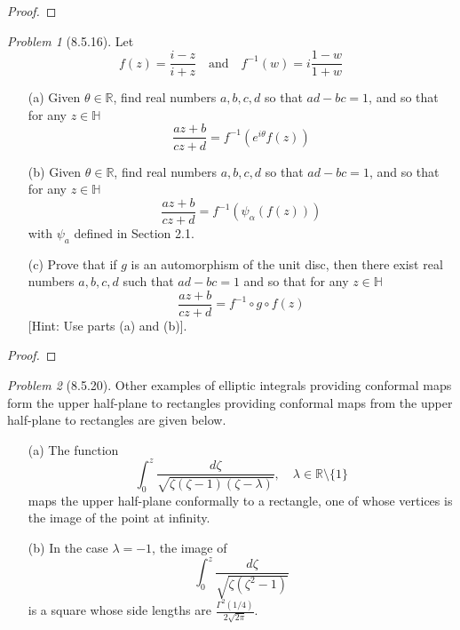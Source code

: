 \documentclass[10pt]{article}
\newcommand{\sk}{\vskip 6mm}
\newcommand{\bb}[1]{\mathbb{#1}}
\theoremstyle{remark}
\newtheorem{problem}{Problem}
\theoremstyle{remark}
\begin{document}
\begin{proof}
  
\end{proof}

\sk

\begin{problem}[8.5.16]
  Let
  \[
    f(z)=\frac{i-z}{i+z}\quad\text{and}\quad f^{-1}(w)=i\frac{1-w}{1+w}
  \]
  \begin{enumerate}
  \item[(a)] Given $\theta\in\bb{R}$, find real numbers $a,b,c,d$ so that
    $ad-bc=1$, and so that for any $z\in\bb{H}$
    \[
      \frac{az+b}{cz+d}=f^{-1}(e^{i\theta}f(z))
    \]
  \item[(b)] Given $\theta\in\bb{R}$, find real numbers $a,b,c,d$ so that
    $ad-bc=1$, and so that for any $z\in\bb{H}$
    \[
      \frac{az+b}{cz+d}=f^{-1}(\psi_\alpha(f(z)))
    \]
    with $\psi_a$ defined in Section 2.1.
  \item[(c)] Prove that if $g$ is an automorphism of the unit disc, then there
    exist real numbers $a,b,c,d$ such that $ad-bc=1$ and so that for any
    $z\in\bb{H}$
    \[
      \frac{az+b}{cz+d}=f^{-1}\circ g\circ f(z)
    \]
    [Hint: Use parts (a) and (b)].
  \end{enumerate}
\end{problem}

\begin{proof}
  
\end{proof}

\sk

\begin{problem}[8.5.20]
  Other examples of elliptic integrals providing conformal maps form the upper
  half-plane to rectangles providing conformal maps from the upper half-plane
  to rectangles are given below.
  \begin{enumerate}
  \item[(a)] The function
    \[
      \int_0^z\frac{d\zeta}{\sqrt{\zeta(\zeta-1)(\zeta-\lambda)}},\quad \lambda\in\bb{R}\setminus\{1\}
    \]
    maps the upper half-plane conformally to a rectangle, one of whose vertices
    is the image of the point at infinity.
  \item[(b)] In the case $\lambda=-1$, the image of
    \[
      \int_0^z\frac{d\zeta}{\sqrt{\zeta(\zeta^2-1)}}
    \]
    is a square whose side lengths are $\frac{\Gamma^2(1/4)}{2\sqrt{2\pi}}$.
  \end{enumerate}
\end{problem}
\end{document}
